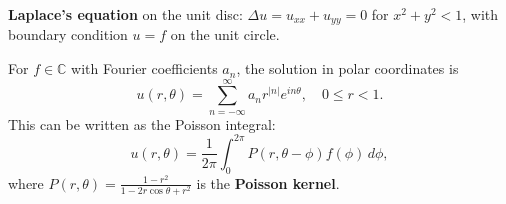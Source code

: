 \textbf{Laplace's equation} on the unit disc: $\Delta u = u_{xx} + u_{yy} = 0$ for $x^2 + y^2 < 1$, with boundary condition $u = f$ on the unit circle.

For $f \in \mathbb{C}$ with Fourier coefficients $a_n$, the solution in polar coordinates is
$$u(r, \theta) = \sum_{n=-\infty}^{\infty} a_n r^{|n|} e^{in\theta}, \quad 0 \leq r < 1.$$
This can be written as the Poisson integral:
$$u(r, \theta) = \frac{1}{2\pi} \int_0^{2\pi} P(r, \theta - \phi) f(\phi) \, d\phi,$$
where $P(r, \theta) = \frac{1 - r^2}{1 - 2r\cos\theta + r^2}$ is the \textbf{Poisson kernel}.
